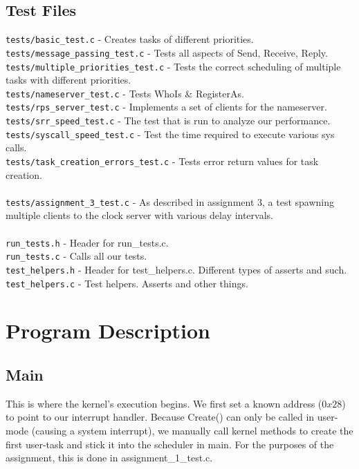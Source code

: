 \documentclass[letterpaper]{article}
\begin{document}
\subsection{Test Files}
\verb!tests/basic_test.c! - Creates tasks of different priorities.\\
\verb!tests/message_passing_test.c! - Tests all aspects of Send, Receive, Reply.\\
\verb!tests/multiple_priorities_test.c! - Tests the correct scheduling of multiple tasks with different priorities.\\
\verb!tests/nameserver_test.c! - Tests WhoIs \& RegisterAs.\\
\verb!tests/rps_server_test.c! - Implements a set of clients for the nameserver.\\
\verb!tests/srr_speed_test.c! - The test that is run to analyze our performance.\\
\verb!tests/syscall_speed_test.c! - Test the time required to execute various sys calls.\\
\verb!tests/task_creation_errors_test.c! - Tests error return values for task creation.\\
\\
\verb!tests/assignment_3_test.c! - As described in assignment 3, a test spawning multiple clients to the clock server with various delay intervals.\\
\\
\verb!run_tests.h! - Header for run\_tests.c.\\
\verb!run_tests.c! - Calls all our tests.\\
\verb!test_helpers.h! - Header for test\_helpers.c. Different types of asserts and such.\\
\verb!test_helpers.c! - Test helpers. Asserts and other things.

\section{Program Description}

\subsection{Main}

This is where the kernel's execution begins. We first set a known address ($0x28$) to point to our interrupt handler. Because Create() can only be called in user-mode (causing a system interrupt), we manually call kernel methods to create the first user-task and stick it into the scheduler in main. For the purposes of the assignment, this is done in assignment\_1\_test.c.
\end{document}
